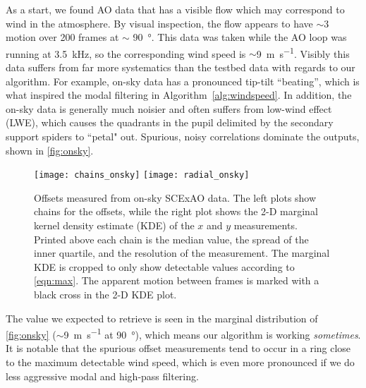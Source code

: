 As a start, we found AO data that has a visible flow which may correspond to wind in the atmosphere. By visual inspection, the flow appears to have $\sim$\SI{3}{\pixel} motion over 200 frames at $\sim$ \SI{90}{\degree}. This data was taken while the AO loop was running at \SI{3.5}{\kilo\hertz}, so the corresponding wind speed is $\sim$\SI{9}{\meter\per\second}. Visibly this data suffers from far more systematics than the testbed data with regards to our algorithm. For example, on-sky data has a pronounced tip-tilt ``beating'', which is what inspired the modal filtering in Algorithm~\autoref{alg:windspeed}. In addition, the on-sky data is generally much noisier and often suffers from low-wind effect (LWE), which causes the quadrants in the pupil delimited by the secondary support spiders to ``petal" out. Spurious, noisy correlations dominate the outputs, shown in \autoref{fig:onsky}.

\begin{figure}
    \centering
    \texttt{[image: chains\_onsky]}
    \texttt{[image: radial\_onsky]}
    \caption{Offsets measured from on-sky SCExAO data. The left plots show chains for the offsets, while the right plot shows the 2-D marginal kernel density estimate (KDE) of the $x$ and $y$ measurements. Printed above each chain is the median value, the spread of the inner quartile, and the resolution of the measurement. The marginal KDE is cropped to only show detectable values according to \autoref{eqn:max}. The apparent motion between frames is marked with a black cross in the 2-D KDE plot.}
    \label{fig:onsky}
\end{figure}

The value we expected to retrieve is seen in the marginal distribution of \autoref{fig:onsky} ($\sim$\SI{9}{\meter\per\second} at \SI{90}{\degree}), which means our algorithm is working \textit{sometimes}. It is notable that the spurious offset measurements tend to occur in a ring close to the maximum detectable wind speed, which is even more pronounced if we do less aggressive modal and high-pass filtering.
